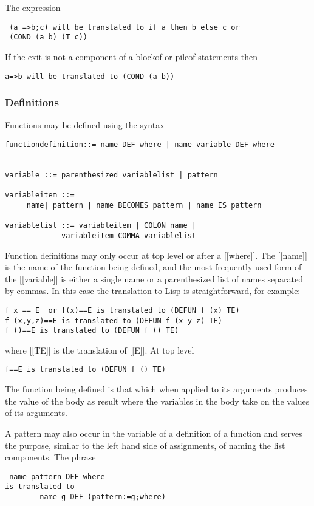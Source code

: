 \documentclass{article}
\begin{document}
The expression
\begin{verbatim} 
 (a =>b;c) will be translated to if a then b else c or
 (COND (a b) (T c))
\end{verbatim} 

If the exit is not a component of a blockof or pileof statements
then 
\begin{verbatim} 
a=>b will be translated to (COND (a b))
\end{verbatim}  

\subsubsection{Definitions}
 
Functions may be defined using the syntax
\begin{verbatim}  
functiondefinition::= name DEF where | name variable DEF where
 
 
variable ::= parenthesized variablelist | pattern
 
variableitem ::=
     name| pattern | name BECOMES pattern | name IS pattern
 
variablelist ::= variableitem | COLON name |
             variableitem COMMA variablelist
\end{verbatim} 

Function definitions may only occur at top level or after a [[where]].
The [[name]] is the name of the function being defined, and the
most frequently used form of the [[variable]] is either a single name
or a parenthesized list of names separated by commas.
In this case the translation to Lisp is straightforward, for example:
\begin{verbatim} 
f x == E  or f(x)==E is translated to (DEFUN f (x) TE)
f (x,y,z)==E is translated to (DEFUN f (x y z) TE)
f ()==E is translated to (DEFUN f () TE)
\end{verbatim} 

where [[TE]] is the translation of [[E]].
At top level 
\begin{verbatim} 
f==E is translated to (DEFUN f () TE)
\end{verbatim} 

The function being defined is that which when applied to its arguments
produces the value of the body as result where the variables
in the body take on the values of its arguments.
 
A pattern may also occur in the variable of a definition of a function
and serves the purpose, similar to the left hand side of assignments,
of naming the list components.
The phrase
\begin{verbatim} 
 name pattern DEF where
is translated to
        name g DEF (pattern:=g;where)
\end{verbatim} 
\end{document}
